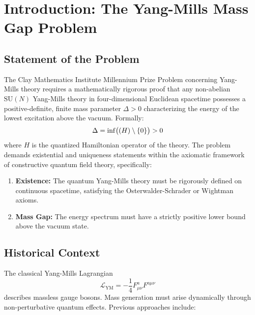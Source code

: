 \documentclass[11pt,a4paper]{article}
\providecommand{\Lagr}{\mathcal{L}}
\let\spec\relax
\DeclareMathOperator{\spec}{spec}
\newcommand{\spec}{\mathrm{spec}}
\theoremstyle{plain}
\theoremstyle{definition}
\begin{document}
\section{Introduction: The Yang-Mills Mass Gap Problem}
\label{sec:introduction}

\subsection{Statement of the Problem}

The Clay Mathematics Institute Millennium Prize Problem concerning Yang-Mills theory requires a mathematically rigorous proof that any non-abelian $\mathrm{SU}(N)$ Yang-Mills theory in four-dimensional Euclidean spacetime possesses a positive-definite, finite mass parameter $\Delta > 0$ characterizing the energy of the lowest excitation above the vacuum. Formally:
\begin{equation}
\Delta = \inf\bigl(\spec(H) \setminus \{0\}\bigr) > 0
\label{eq:mass_gap_def}
\end{equation}
where $H$ is the quantized Hamiltonian operator of the theory. The problem demands existential and uniqueness statements within the axiomatic framework of constructive quantum field theory, specifically:
\begin{enumerate}[label=(\roman*)]
\item \textbf{Existence:} The quantum Yang-Mills theory must be rigorously defined on continuous spacetime, satisfying the Osterwalder-Schrader or Wightman axioms.
\item \textbf{Mass Gap:} The energy spectrum must have a strictly positive lower bound above the vacuum state.
\end{enumerate}

\subsection{Historical Context}

The classical Yang-Mills Lagrangian
\begin{equation}
\Lagr_{\mathrm{YM}} = -\frac{1}{4} F^a_{\mu\nu} F^{a\mu\nu}
\label{eq:ym_classical}
\end{equation}
describes massless gauge bosons. Mass generation must arise dynamically through non-perturbative quantum effects. Previous approaches include:
\end{document}
